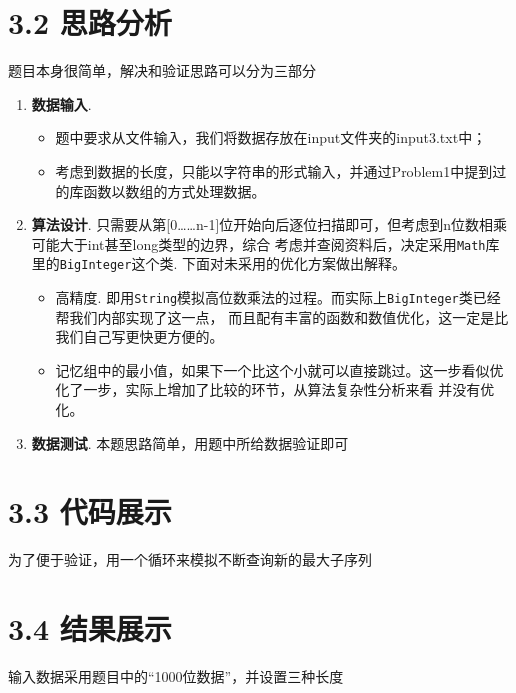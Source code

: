 \section{3.2 思路分析}

题目本身很简单，解决和验证思路可以分为三部分
\begin{enumerate}
    \item \textbf{数据输入}. 
        \begin{itemize}
            \item 题中要求从文件输入，我们将数据存放在input文件夹的input3.txt中；
            \item 考虑到数据的长度，只能以字符串的形式输入，并通过Problem1中提到过的库函数以数组的方式处理数据。
        \end{itemize}
    \item \textbf{算法设计}. 只需要从第[0……n-1]位开始向后逐位扫描即可，但考虑到n位数相乘可能大于int甚至long类型的边界，综合
        考虑并查阅资料后，决定采用\lstinline{Math}库里的\lstinline{BigInteger}这个类. 下面对未采用的优化方案做出解释。
        \begin{itemize}
            \item 高精度. 即用\lstinline{String}模拟高位数乘法的过程。而实际上\lstinline{BigInteger}类已经帮我们内部实现了这一点，
                而且配有丰富的函数和数值优化，这一定是比我们自己写更快更方便的。
            \item 记忆组中的最小值，如果下一个比这个小就可以直接跳过。这一步看似优化了一步，实际上增加了比较的环节，从算法复杂性分析来看
                并没有优化。
        \end{itemize}
    \item \textbf{数据测试}. 本题思路简单，用题中所给数据验证即可
\end{enumerate}

\section{3.3 代码展示}

为了便于验证，用一个循环来模拟不断查询新的最大子序列



\section{3.4 结果展示}

输入数据采用题目中的“1000位数据”，并设置三种长度

